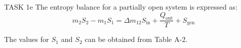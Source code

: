 TASK 1e  
The entropy balance for a partially open system is expressed as:  
\[
m_2 S_2 - m_1 S_1 = \Delta m_{12} S_{\text{in}} + \frac{Q_{\text{out}}}{T} + S_{\text{gen}}
\]  

The values for \( S_1 \) and \( S_2 \) can be obtained from Table A-2.